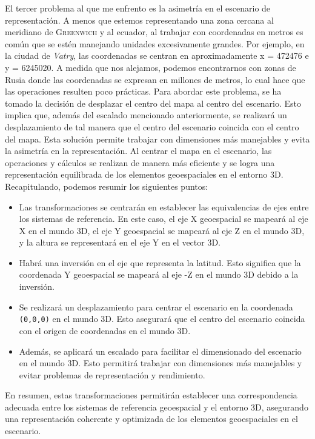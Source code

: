 \documentclass[a4paper, 11pt]{book}
\begin{document}
El tercer problema al que me enfrento es la asimetría en el escenario de representación. A menos que estemos representando una zona cercana al meridiano de \textsc{Greenwich} y al ecuador, al trabajar con coordenadas en metros es común que se estén manejando unidades excesivamente grandes. Por ejemplo, en la ciudad de \emph{Vatry}, las coordenadas se centran en aproximadamente x = 472476 e y = 6245020. A medida que nos alejamos, podemos encontrarnos con zonas de Rusia donde las coordenadas se expresan en millones de metros, lo cual hace que las operaciones resulten poco prácticas.
Para abordar este problema, se ha tomado la decisión de desplazar el centro del mapa al centro del escenario. Esto implica que, además del escalado mencionado anteriormente, se realizará un desplazamiento de tal manera que el centro del escenario coincida con el centro del mapa.
Esta solución permite trabajar con dimensiones más manejables y evita la asimetría en la representación. Al centrar el mapa en el escenario, las operaciones y cálculos se realizan de manera más eficiente y se logra una representación equilibrada de los elementos geoespaciales en el entorno 3D.
Recapitulando, podemos resumir los siguientes puntos:
\begin{itemize}
    \item Las transformaciones se centrarán en establecer las equivalencias de ejes entre los sistemas de referencia. En este caso, el eje \textsc{X} \gls{geoespacial} se mapeará al eje X en el mundo \textsc{3D}, el eje Y geoespacial se mapeará al eje \textsc{Z} en el mundo \textsc{3D}, y la altura se representará en el eje Y en el vector 3D.
    \item Habrá una inversión en el eje que representa la latitud. Esto significa que la coordenada Y geoespacial se mapeará al eje \textsc{-Z} en el mundo \textsc{3D} debido a la inversión.
    \item Se realizará un desplazamiento para centrar el escenario en la coordenada \texttt{(0,0,0)} en el mundo \textsc{3D}. Esto asegurará que el centro del escenario coincida con el origen de coordenadas en el mundo \textsc{3D}.
    \item Además, se aplicará un escalado para facilitar el dimensionado del escenario en el mundo \textsc{3D}. Esto permitirá trabajar con dimensiones más manejables y evitar problemas de representación y rendimiento.
\end{itemize}
En resumen, estas transformaciones permitirán establecer una correspondencia adecuada entre los sistemas de referencia geoespacial y el entorno 3D, asegurando una representación coherente y optimizada de los elementos geoespaciales en el escenario.
\end{document}

